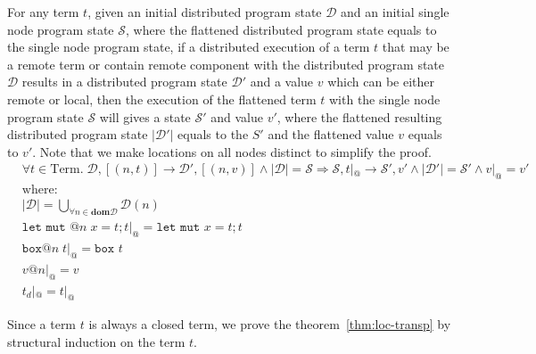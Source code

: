 \begin{theorem}
For any term $t$, given an initial distributed program state $\mathcal{D}$ and an initial single node program state $\mathcal{S}$, where the flattened distributed program state equals to the single node program state, if a distributed execution of a term $t$ that may be a remote term or contain remote component with the distributed program state $\mathcal{D}$ results in a distributed program state $\mathcal{D}'$ and a value $v$ which can be either remote or local, then the execution of the flattened term $t$ with the single node program state $\mathcal{S}$ will gives a state $\mathcal{S}'$ and value $v'$, where the flattened resulting distributed program state $|\mathcal{D}'|$ equals to the $S'$ and the flattened value $v$ equals to $v'$. Note that we make locations on all nodes distinct to simplify the proof.
\begin{align*}
    &\forall t \in \mathrm{Term}.\; \mathcal{D}, [(n, t)] \longrightarrow \mathcal{D'}, [(n, v)] \land |\mathcal{D}| = \mathcal{S}  \Rightarrow \mathcal{S},  t|_@ \longrightarrow \mathcal{S'}, v' \land |\mathcal{D}'| = \mathcal{S}' \land v|_@ = v'\\
    &\mathrm{where:}\\
    &|\mathcal{D}| = \bigcup_{\forall n \in \textbf{dom} \mathcal{D}} \mathcal{D}(n)\\
    &\texttt{let mut }@n\; x=t; t|_@ =  \texttt{let mut } x=t; t\\
    &\texttt{box}@n\; t |_@ = \texttt{box }t\\
    &v@n|_@ = v\\
    &t_d|_@ = t |_@
\end{align*}
\label{chap3:thm:loc-transp}
\end{theorem}
Since a term $t$ is always a closed term, we prove the theorem~\ref{thm:loc-transp} by structural induction on the term $t$.
